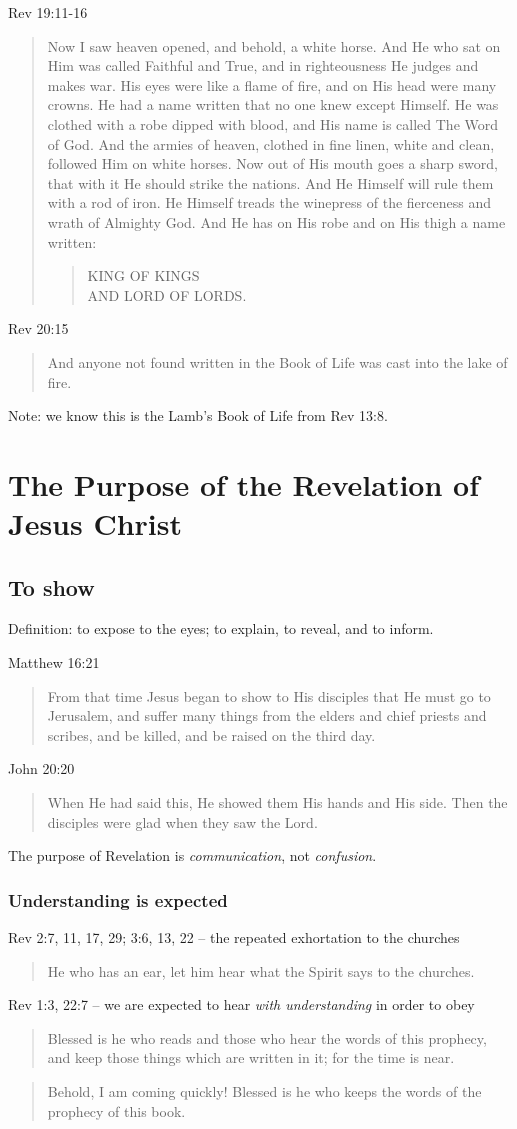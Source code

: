 \documentclass[12pt]{article}
\newcommand{\I}{\item}
\newcommand{\Q}[1]{\begin{quote} #1 \end{quote}}
\begin{document}
\I Rev 19:11-16 \Q{Now I saw heaven opened, and behold, a white horse.
                And He who sat on Him was called Faithful and True,
                and in righteousness He judges and makes war.
                His eyes were like a flame of fire, and on His head were
                many crowns. He had a name written that no one knew except
                Himself. He was clothed with a robe dipped with blood,
                and His name is called The Word of God.
                And the armies of heaven, clothed in fine linen, white and
                clean, followed Him on white horses.
                Now out of His mouth goes a sharp sword, that with it He 
                should strike the nations. And He Himself will rule them 
                with a rod of iron. He Himself treads the winepress of the
                fierceness and wrath of Almighty God. And He has on His robe 
                and on His thigh a name written:
                \Q{KING OF KINGS \\ AND LORD OF LORDS.}}

\I Rev 20:15 \Q{And anyone not found written in the Book of Life was cast 
                into the lake of fire.}
            Note: we know this is the Lamb's Book of Life from Rev 13:8.

\section{The Purpose of the Revelation of Jesus Christ}
\subsection{To show}
\I Definition: to expose to the eyes; to explain, to reveal, and to inform.
\I Matthew 16:21 \Q{From that time Jesus began to show to His disciples
                    that He must go to Jerusalem, and suffer many things from
                    the elders and chief priests and scribes, and be killed,
                    and be raised on the third day.}
\I John 20:20 \Q{When He had said this, He showed them His hands and His side.
                Then the disciples were glad when they saw the Lord.}
\I The purpose of Revelation is \emph{communication}, not \emph{confusion}.
\subsubsection{Understanding is expected}
\I Rev 2:7, 11, 17, 29; 3:6, 13, 22 -- the repeated exhortation to the churches
    \Q{He who has an ear, let him hear what the Spirit says to the churches.}
\I Rev 1:3, 22:7 -- we are expected to hear \emph{with understanding} in order
    to obey
    \Q{Blessed is he who reads and those who hear the words of this prophecy,
    and keep those things which are written in it; for the time is near.}
    \Q{Behold, I am coming quickly! Blessed is he who keeps the words 
    of the prophecy of this book.}
\end{document}
